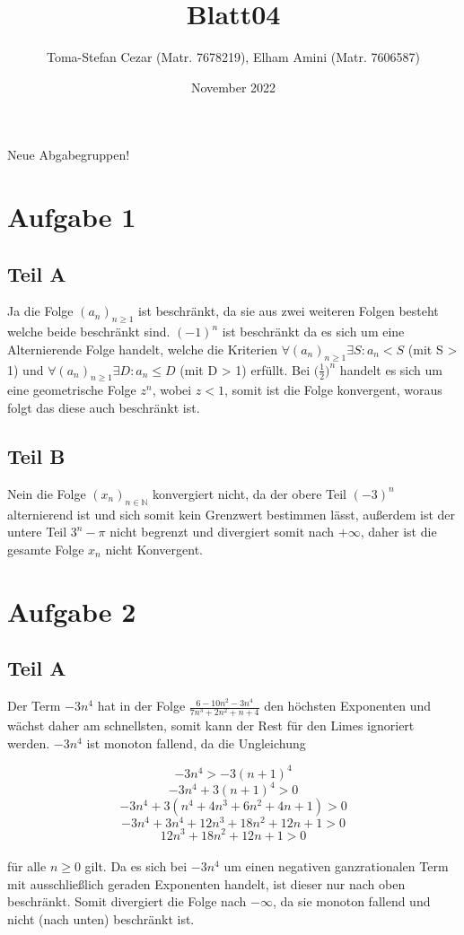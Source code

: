 \documentclass[a4paper,tikz]{article}
\title{Blatt04}
\author{Toma-Stefan Cezar (Matr. 7678219), Elham Amini (Matr. 7606587)}
\date{November 2022}
\begin{document}
\maketitle
Neue Abgabegruppen!
\tableofcontents
\newpage

\section{Aufgabe 1}
\subsection{Teil A}
Ja die Folge $(a_n)_{n \geq 1}$ ist beschränkt, da sie aus zwei weiteren Folgen besteht welche beide beschränkt sind. $(-1)^n$ ist beschränkt da es sich um eine Alternierende Folge handelt, welche die Kriterien $\forall (a_n)_{n \geq 1} \exists S :  a_n < S$ (mit S > 1) und $\forall (a_n)_{n \geq 1} \exists D :  a_n \leq D$ (mit D > 1) erfüllt. Bei $\big( \frac{1}{2} \big)^n$ handelt es sich um eine geometrische Folge $z^n$, wobei $z < 1$, somit ist die Folge konvergent, woraus folgt das diese auch beschränkt ist.

\subsection{Teil B}


Nein die Folge $(x_n)_{n \in \mathbb{N}}$ konvergiert nicht, da der obere Teil $(-3)^n$ alternierend ist und sich somit kein Grenzwert bestimmen lässt, außerdem ist  der untere Teil $3^n - \pi$ nicht begrenzt und divergiert somit nach $+ \infty$, daher ist die gesamte Folge $x_n$ nicht Konvergent.


\section{Aufgabe 2}

\subsection{Teil A}

Der Term $-3n^4$ hat in der Folge $\frac{6-10n^2-3n^4}{7n^3 + 2n^2 + n + 4 }$ den höchsten Exponenten und wächst daher am schnellsten, somit kann der Rest für den Limes ignoriert werden. $-3n^4$ ist monoton fallend, da die Ungleichung

\[-3n^4 > -3(n+1)^4\]
\[-3n^4 + 3(n+1)^4  > 0 \]
\[-3n^4 + 3(n^4+4n^3+6n^2+4n+1)  > 0 \]
\[-3n^4 + 3n^4 + 12n^3 + 18n^2 + 12n + 1 > 0 \]
\[12n^3 + 18n^2 + 12n + 1 > 0 \]
\\
für alle $n \geq 0$ gilt. Da es sich bei $-3n^4$ um einen negativen ganzrationalen Term mit ausschließlich geraden Exponenten handelt, ist dieser nur nach oben beschränkt. Somit divergiert die Folge nach $- \infty$, da sie monoton fallend und nicht (nach unten) beschränkt ist.
\end{document}
